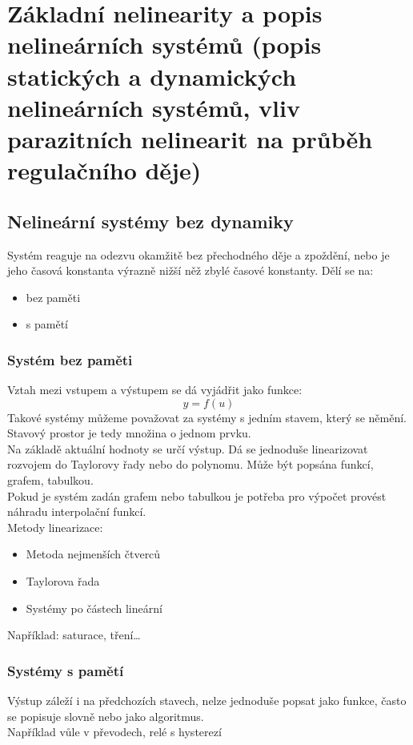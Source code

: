 \section{Základní nelinearity a popis nelineárních systémů (popis statických a dynamických nelineárních systémů,
  vliv parazitních nelinearit na průběh regulačního děje)}

\subsection{Nelineární systémy bez dynamiky}
Systém reaguje na odezvu okamžitě bez přechodného děje a zpoždění, nebo je jeho časová konstanta výrazně nižší něž zbylé časové konstanty.
Dělí se na:
\begin{itemize}
    \item bez paměti
    \item s pamětí
\end{itemize}

\subsubsection*{Systém bez paměti}
Vztah mezi vstupem a výstupem se dá vyjádřit jako funkce:
\begin{equation}
    y=f(u)
\end{equation}
Takové systémy můžeme považovat za systémy s jedním stavem, který se němění. Stavový prostor je tedy množina o jednom prvku.\\
Na základě aktuální hodnoty se určí výstup. Dá se jednoduše linearizovat rozvojem do Taylorovy řady nebo do polynomu. Může být popsána funkcí, grafem, tabulkou.\\
Pokud je systém zadán grafem nebo tabulkou je potřeba pro výpočet provést náhradu interpolační funkcí.\\
Metody linearizace:
\begin{itemize}
    \item Metoda nejmenších čtverců
    \item Taylorova řada
    \item Systémy po částech lineární
\end{itemize}
Například: saturace, tření\dots

\subsubsection*{Systémy s pamětí}
Výstup záleží i na předchozích stavech, nelze jednoduše popsat jako funkce, často se popisuje slovně nebo jako algoritmus.
\\
Například vůle v převodech, relé s hysterezí

